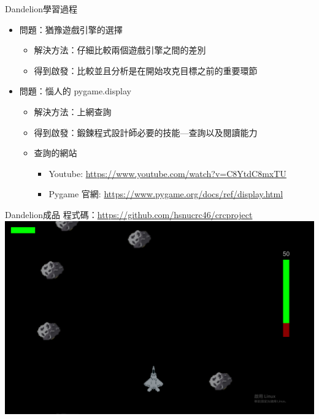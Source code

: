 \documentclass{article}
\begin{document}
\begin{large}
    \begin{boxpar}{Dandelion}{學習過程}
\begin{itemize}
    \item 問題：猶豫遊戲引擎的選擇
        \begin{itemize}
            \item 解決方法：仔細比較兩個遊戲引擎之間的差別
            \item 得到啟發：比較並且分析是在開始攻克目標之前的重要環節
        \end{itemize}
        \item 問題：惱人的 pygame.display
        \begin{itemize}
            \item 解決方法：上網查詢
            \item 得到啟發：鍛鍊程式設計師必要的技能—查詢以及閱讀能力
            \item 查詢的網站
                \begin{itemize}
                    \item Youtube: \url{https://www.youtube.com/watch?v=C8YtdC8mxTU}
                    \item Pygame 官網: \url{https://www.pygame.org/docs/ref/display.html}
                \end{itemize}
        \end{itemize}
\end{itemize}
    \end{boxpar}
\newpage
\begin{boxpar}{Dandelion}{成品}
    程式碼：\url{https://github.com/hsnucrc46/crcproject}\\
    \includegraphics[width=\linewidth]{src/game.png}
\end{boxpar}
\end{large}
\end{document}
